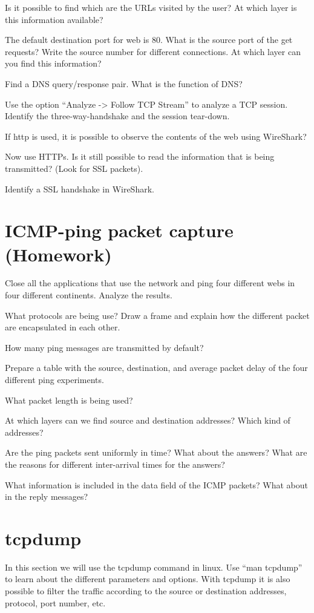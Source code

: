 Is it possible to find which are the URLs visited by the user?
At which layer is this information available?

The default destination port for web is 80.
What is the source port of the get requests?
Write the source number for different connections.
At which layer can you find this information?

Find a DNS query/response pair.
What is the function of DNS?

Use the option ``Analyze -> Follow TCP Stream'' to analyze a TCP session.
Identify the three-way-handshake and the session tear-down.

If http is used, it is possible to observe the contents of the web using WireShark?

Now use HTTPs.
Is it still possible to read the information that is being transmitted?
(Look for SSL packets).

Identify a SSL handshake in WireShark.

\section{ICMP-ping packet capture (Homework)}

Close all the applications that use the network and ping four different webs in four different continents.
Analyze the results.

What protocols are being use?
Draw a frame and explain how the different packet are encapsulated in each other.

How many ping messages are transmitted by default?

Prepare a table with the source, destination, and average packet delay  of the four different ping experiments.

What packet length is being used?

At which layers can we find source and destination addresses?
Which kind of addresses?

Are the ping packets sent uniformly in time?
What about the answers?
What are the reasons for different inter-arrival times for the answers?

What information is included in the data field of the ICMP packets?
What about in the reply messages?

\section{tcpdump}

In this section we will use the tcpdump command in linux.
Use ``man tcpdump'' to learn about the different parameters and options.
With tcpdump it is also possible to filter the traffic according to the source or destination addresses, protocol, port number, etc.

